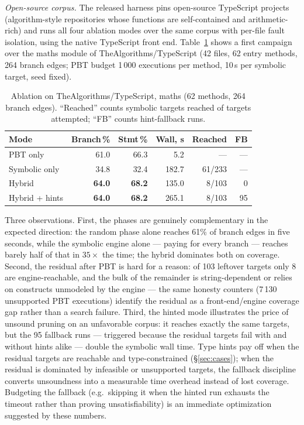 \documentclass[sigconf,nonacm,screen]{acmart}
\begin{document}
\emph{Open-source corpus.} The released harness pins open-source
TypeScript projects (algorithm-style repositories whose functions are
self-contained and arithmetic-rich) and runs all four ablation modes over
the same corpus with per-file fault isolation, using the native TypeScript
front end. Table~\ref{tab:maths} shows a first campaign over the
\textsf{maths} module of \textsf{TheAlgorithms/TypeScript} (42 files,
62 entry methods, 264 branch edges; PBT budget 1\,000 executions per
method, 10\,s per symbolic target, seed fixed).

\begin{table}[t]
\caption{Ablation on \textsf{TheAlgorithms/TypeScript}, \textsf{maths}
(62 methods, 264 branch edges). ``Reached'' counts symbolic targets
reached of targets attempted; ``FB'' counts hint-fallback runs.}
\label{tab:maths}
\small
\begin{tabular}{lrrrrr}
\toprule
Mode & Branch\,\% & Stmt\,\% & Wall, s & Reached & FB \\
\midrule
PBT only          & 61.0 & 66.3 & 5.2   & ---     & --- \\
Symbolic only     & 34.8 & 32.4 & 182.7 & 61/233  & --- \\
Hybrid            & \textbf{64.0} & \textbf{68.2} & 135.0 & 8/103 & 0 \\
Hybrid + hints    & \textbf{64.0} & \textbf{68.2} & 265.1 & 8/103 & 95 \\
\bottomrule
\end{tabular}
\end{table}

Three observations. First, the phases are genuinely complementary in the
expected direction: the random phase alone reaches 61\% of branch edges in
five seconds, while the symbolic engine alone --- paying for every branch
--- reaches barely half of that in $35\times$ the time; the hybrid
dominates both on coverage. Second, the residual after PBT is hard for a
reason: of 103 leftover targets only 8 are engine-reachable, and the bulk
of the remainder is string-dependent or relies on constructs unmodeled by
the engine --- the same honesty counters (7\,130 unsupported PBT
executions) identify the residual as a front-end/engine coverage gap
rather than a search failure. Third, the hinted mode illustrates the price
of unsound pruning on an unfavorable corpus: it reaches exactly the same
targets, but the 95 fallback runs --- triggered because the residual
targets fail with and without hints alike --- double the symbolic wall
time. Type hints pay off when the residual targets are reachable and
type-constrained (\S\ref{sec:cases}); when the residual is dominated by
infeasible or unsupported targets, the fallback discipline converts
unsoundness into a measurable time overhead instead of lost coverage.
Budgeting the fallback (e.g.\ skipping it when the hinted run exhausts the
timeout rather than proving unsatisfiability) is an immediate optimization
suggested by these numbers.
\end{document}
